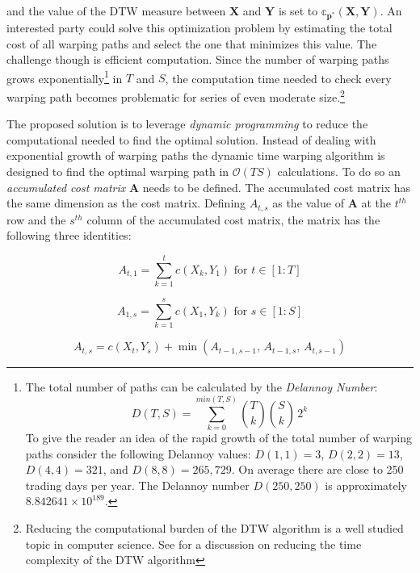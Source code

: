 \documentclass[12pt]{report}
\begin{document}
and the value of the DTW measure between $\boldsymbol{X}$ and $\boldsymbol{Y}$ is set to $\mathbb{c}_{\boldsymbol{p^{*}}}(\boldsymbol{X}, \boldsymbol{Y})$. An interested party could solve this optimization problem by estimating the total cost of all warping paths and select the one that minimizes this value. The challenge though is efficient computation. Since the number of warping paths grows exponentially\footnote{The total number of paths can be calculated by the \textit{Delannoy Number}: \begin{equation} D(T, S) = \sum^{min(T, S)}_{k=0} {T\choose k} {S\choose k}\, 2^{k} \end{equation} To give the reader an idea of the rapid growth of the total number of warping paths consider the following Delannoy values: $D(1,1)=3$, $D(2,2) = 13$, $D(4,4) = 321$, and $D(8, 8) = 265,729$. On average there are close to 250 trading days per year. The Delannoy number $D(250, 250)$ is approximately $8.842641\times10^{189}$.} in $T$ and $S$, the computation time needed to check every warping path becomes problematic for series of even moderate size.\footnote{Reducing the computational burden of the DTW algorithm is a well studied topic in computer science. See \cite{KeoghRatanamahatana_2005} for a discussion on reducing the time complexity of the DTW algorithm}

The proposed solution is to leverage \emph{dynamic programming} to reduce the computational needed to find the optimal solution. Instead of dealing with exponential growth of warping paths the dynamic time warping algorithm is designed to find the optimal warping path in $\mathcal{O}(TS)$ calculations. To do so an \emph{accumulated cost matrix} $\boldsymbol{A}$ needs to be defined. The accumulated cost matrix has the same dimension as the cost matrix. Defining $A_{t,s}$ as the value of $\boldsymbol{A}$ at the $t^{th}$ row and the $s^{th}$ column of the accumulated cost matrix, the matrix has the following three identities:

\begin{equation} \label{eq:dtw_accum_cost_x_axis}
    A_{t,1} = \sum^{t}_{k=1} c(X_{k}, Y_{1}) \,\, \textrm{for} \,\, t \in [1:T]
\end{equation}

\begin{equation} \label{eq:dtw_accum_cost_y_axis}
    A_{1,s} = \sum^{s}_{k=1} c(X_{1}, Y_{k}) \,\, \textrm{for} \,\, s \in [1:S]
\end{equation}

\begin{equation} \label{eq:dtw_recursive_calculation}
    A_{t, s} = c(X_{t}, Y_{s}) + \min\left(A_{t-1, s-1}, \, A_{t-1, s}, \, A_{t, s-1}\right)
\end{equation}
\end{document}
